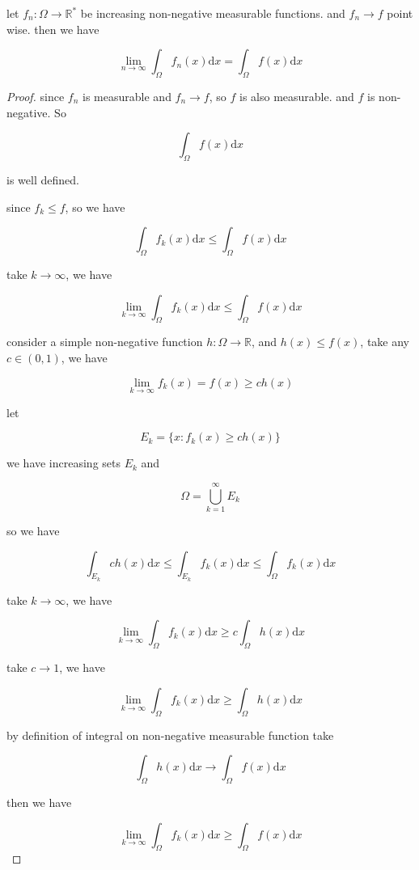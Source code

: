 \documentclass[11pt,a4paper]{article}
\begin{document}
\begin{exercise}
    let $f_n: \Omega \to \mathbb{R}^*$ be increasing non-negative measurable functions. and $f_n \to f$ point wise.
    then we have 

    \[
        \lim_{n \to \infty}\int_{\Omega}f_n(x) \mathrm{d}x = \int_{\Omega}f(x) \mathrm{d}x
    \]
\end{exercise}

\begin{proof}
    since $f_n$ is measurable and $f_n \to f$, so $f$ is also measurable. and $f$ is non-negative. So

    \[
        \int_{\Omega}f(x) \mathrm{d}x
    \]

    is well defined.

    since $f_k \le f$, so we have

    \[
        \int_{\Omega}f_k(x) \mathrm{d}x \le \int_{\Omega}f(x) \mathrm{d}x
    \]

    take $k \to \infty$, we have

    \[
        \lim_{k \to \infty}\int_{\Omega}f_k(x) \mathrm{d}x \le \int_{\Omega}f(x) \mathrm{d}x
    \]

    consider a simple non-negative function $h: \Omega \to \mathbb{R}$, and $h(x) \le f(x)$, take any $c \in (0,1)$, we have

    \[
        \lim_{k \to \infty}f_k(x) = f(x) \ge ch(x)
    \]

    let 

    \[
        E_k = \{x: f_k(x) \ge ch(x) \}
    \]

    we have increasing sets $E_k$ and

    \[
        \Omega = \bigcup_{k=1}^{\infty}E_k
    \]

    so we have

    \[
    \int_{E_k}ch(x)\mathrm{d}x \le \int_{E_k}f_k(x) \mathrm{d}x \le \int_{\Omega}f_k(x) \mathrm{d}x
    \]

    take $k \to \infty$, we have

    \[
    \lim_{k \to \infty}\int_{\Omega}f_k(x) \mathrm{d}x \ge c \int_{\Omega}h(x) \mathrm{d}x
    \]

    take $c \to 1$, we have


    \[
    \lim_{k \to \infty}\int_{\Omega}f_k(x) \mathrm{d}x \ge  \int_{\Omega}h(x) \mathrm{d}x
    \]

    by definition of integral on non-negative measurable function take

    \[
        \int_{\Omega}h(x) \mathrm{d}x \to \int_{\Omega}f(x) \mathrm{d}x
    \]

    then we have

    \[
    \lim_{k \to \infty}\int_{\Omega}f_k(x) \mathrm{d}x \ge  \int_{\Omega}f(x) \mathrm{d}x
    \]
\end{proof}
\end{document}

